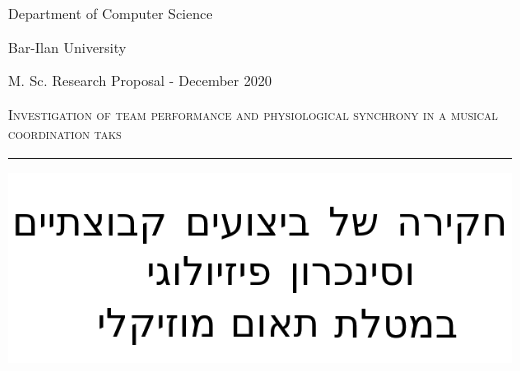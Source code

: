 \documentclass[a4paper, 11pt]{report}      %
\begin{document}
\begin{titlepage} %
	
	{\centering %
	
	
		\vspace{0.05\textheight} %
	
	\huge{Department of Computer Science
	
	Bar-Ilan University
	
	\vspace{30pt}}
	\Large{
	M. Sc. Research Proposal - December 2020
	}
	\vspace{15pt}
	
	
{\renewcommand{\baselinestretch}{1.8}\selectfont
    {\Huge \textsc{Investigation of team performance 
and physiological synchrony
in a musical coordination taks}} %
\par}

	
	\vspace{0.025\textheight} %
	
	\rule{0.3\textwidth}{0.4pt} %
    \includegraphics[scale=0.7]{hebrew_title1s.png}
	
}
\end{titlepage}
\end{document}

